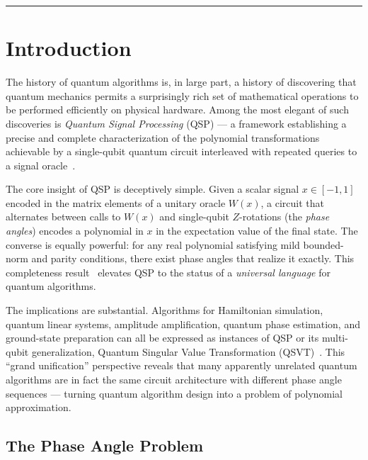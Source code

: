 \documentclass[11pt,a4paper]{article}
\begin{document}
\vspace{0.5em}
\noindent\rule{\textwidth}{0.3pt}
\vspace{0.3em}

\section{Introduction}

The history of quantum algorithms is, in large part, a history of discovering that quantum mechanics permits a surprisingly rich set of mathematical operations to be performed efficiently on physical hardware. Among the most elegant of such discoveries is \emph{Quantum Signal Processing} (QSP) --- a framework establishing a precise and complete characterization of the polynomial transformations achievable by a single-qubit quantum circuit interleaved with repeated queries to a signal oracle~\cite{low2017optimal}.

The core insight of QSP is deceptively simple. Given a scalar signal $x \in [-1, 1]$ encoded in the matrix elements of a unitary oracle $W(x)$, a circuit that alternates between calls to $W(x)$ and single-qubit $Z$-rotations (the \emph{phase angles}) encodes a polynomial in $x$ in the expectation value of the final state. The converse is equally powerful: for any real polynomial satisfying mild bounded-norm and parity conditions, there exist phase angles that realize it exactly. This completeness result~\cite{low2017optimal, gilyen2019quantum} elevates QSP to the status of a \emph{universal language} for quantum algorithms.

The implications are substantial. Algorithms for Hamiltonian simulation, quantum linear systems, amplitude amplification, quantum phase estimation, and ground-state preparation can all be expressed as instances of QSP or its multi-qubit generalization, Quantum Singular Value Transformation (QSVT)~\cite{martyn2021grand, gilyen2019quantum}. This ``grand unification'' perspective reveals that many apparently unrelated quantum algorithms are in fact the same circuit architecture with different phase angle sequences --- turning quantum algorithm design into a problem of polynomial approximation.

\subsection{The Phase Angle Problem}
\end{document}

